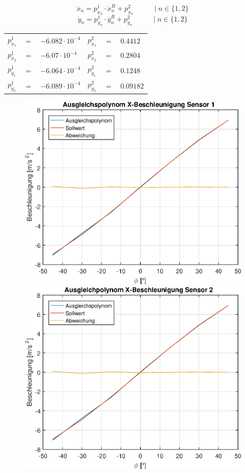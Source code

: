 \vspace*{-\baselineskip}
\begin{equation}
\ddot{x}_n = p^1_{x_n} \cdot \ddot{x}^R_n + p^2_{x_n} \hspace{35pt} \vert \hspace{3pt} n \in \{1, 2\}
\end{equation}
\begin{equation}
\ddot{y}_n = p^1_{y_n} \cdot \ddot{y}^R_n + p^2_{y_n} \hspace{35pt} \vert \hspace{3pt} n \in \{1, 2\}
\end{equation}
\vspace*{-\baselineskip}
\begin{table}[h]
\centering
\begin{tabular}{lcllcl}
$p^1_{x_1}$ &$=$& $-6.082 \cdot 10^{-4}$ & $p^2_{x_1}$ &$=$& $0.4412$ \\
$p^1_{x_2}$ &$=$& $-6.07 \cdot 10^{-4}$ & $p^2_{x_2}$ &$=$& $0.2804$ \\
$p^1_{y_1}$ &$=$& $-6.064 \cdot 10^{-4}$ & $p^2_{y_1}$ &$=$& $0.1248$ \\
$p^1_{y_2}$ &$=$& $-6.089 \cdot 10^{-4}$ & $p^2_{y_2}$ &$=$& $0.09182$ \\
\end{tabular}
\end{table}

\vspace*{-\baselineskip}
\begin{figure}[h]
	\includegraphics[width=0.5\linewidth]{img/X1__dd___fitted.eps}
	\includegraphics[width=0.5\linewidth]{img/X2__dd___fitted.eps}
\end{figure}


